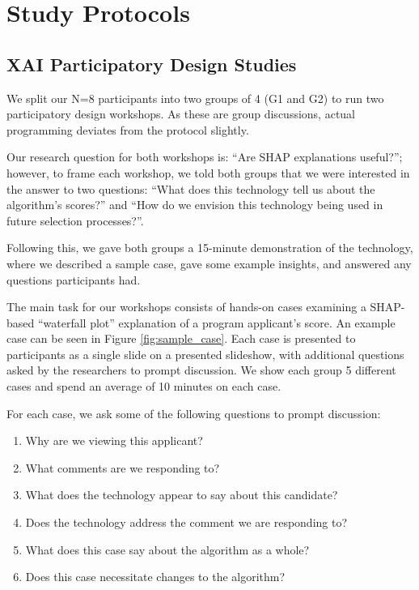 

\chapter{\label{app:protocolmockup}Study Protocols}

\minitoc

\section{XAI Participatory Design Studies}\label{app:protocol}
We split our N=8 participants into two groups of 4 (G1 and G2) to run two participatory design workshops. As these are group discussions, actual programming deviates from the protocol slightly.

Our research question for both workshops is: ``Are SHAP explanations useful?''; however, to frame each workshop, we told both groups that we were interested in the answer to two questions: ``What does this technology tell us about the algorithm’s scores?'' and ``How do we envision this technology being used in future selection processes?''.

Following this, we gave both groups a 15-minute demonstration of the technology, where we described a sample case, gave some example insights, and answered any questions participants had. 

The main task for our workshops consists of hands-on cases examining a SHAP-based ``waterfall plot'' explanation of a program applicant's score. An example case can be seen in Figure \ref{fig:sample_case}. Each case is presented to participants as a single slide on a presented slideshow, with additional questions asked by the researchers to prompt discussion. We show each group 5 different cases and spend an average of 10 minutes on each case.

For each case, we ask some of the following questions to prompt discussion:

\begin{enumerate}
    \item Why are we viewing this applicant?
    \item What comments are we responding to?
    \item What does the technology appear to say about this candidate?
    \item Does the technology address the comment we are responding to?
    \item What does this case say about the algorithm as a whole?
    \item Does this case necessitate changes to the algorithm?
\end{enumerate}

